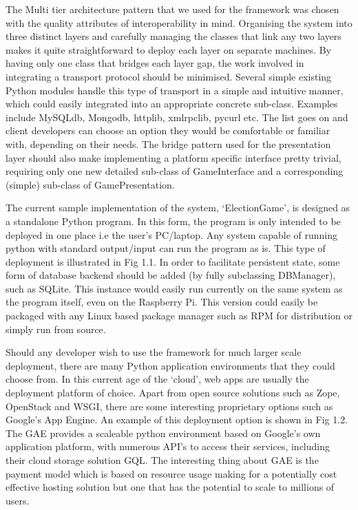 \documentclass[11pt]{report}
\begin{document}
The Multi tier architecture pattern that we used for the framework was chosen with the quality attributes of interoperability in mind. Organising the system into three distinct layers and carefully managing the classes that link any two layers makes it quite straightforward to deploy each layer on separate machines. By having only one class that bridges each layer gap, the work involved in integrating a transport protocol should be minimised. Several simple existing Python modules handle this type of transport in a simple and intuitive manner, which could easily integrated into an appropriate concrete sub-class. Examples include MySQLdb, Mongodb, httplib, xmlrpclib, pycurl etc. The list goes on and client developers can choose an option they would be comfortable or familiar with, depending on their needs. The bridge pattern used for the presentation layer should also make implementing a platform specific interface pretty trivial, requiring only one new detailed sub-class of GameInterface and a corresponding (simple) sub-class of GamePresentation. 

The current sample implementation of the system, ‘ElectionGame’, is designed as a standalone Python program. In this form, the program is only intended to be deployed in one place i.e the user’s PC/laptop. Any system capable of running python with standard output/input can run the program as is. This type of deployment is illustrated in Fig 1.1. In order to facilitate persistent state, some form of database backend should be added (by fully subclassing DBManager), such as SQLite. This instance would easily run currently on the same system as the program itself, even on the Raspberry Pi. This version could easily be packaged with any Linux based package manager such as RPM for distribution or simply run from source.

Should any developer wish to use the framework for much larger scale deployment, there are many Python application environments that they could choose from. In this current age of the ‘cloud’, web apps are usually the deployment platform of choice. Apart from open source solutions such as Zope, OpenStack and WSGI, there are some interesting proprietary options such as Google’s App Engine. An example of this deployment option is shown in Fig 1.2. The GAE provides a scaleable python environment based on Google’s own application platform, with numerous API’s to access their services, including their cloud storage solution GQL. The interesting thing about GAE is the payment model which is based on resource usage making for a potentially cost effective hosting solution but one that has the potential to scale to millions of users. 
\end{document}
